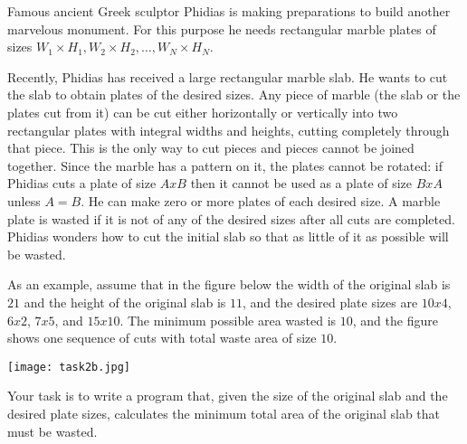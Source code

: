 Famous ancient Greek sculptor Phidias is making preparations to build another marvelous monument.
For this purpose he needs rectangular marble plates of sizes $W_1\times H_1, W_2 \times H_2, \ldots, W_N \times H_N$.

Recently, Phidias has received a large rectangular marble slab.
He wants to cut the slab to obtain plates of the desired sizes.
Any piece of marble (the slab or the plates cut from it) can be cut either horizontally or vertically into two rectangular plates with integral widths and heights, cutting completely through that piece.
This is the only way to cut pieces and pieces cannot be joined together.
Since the marble has a pattern on it, the plates cannot be rotated: if Phidias cuts a plate of size $A x B$ then it cannot be used as a plate of size $B x A$ unless $A = B$.
He can make zero or more plates of each desired size.
A marble plate is wasted if it is not of any of the desired sizes after all cuts are completed.
Phidias wonders how to cut the initial slab so that as little of it as possible will be wasted.

As an example, assume that in the figure below the width of the original slab is $21$ and the height of the original slab is $11$, and the desired plate sizes are $10 x 4$, $6 x 2$, $7 x 5$, and $15 x 10$.
The minimum possible area wasted is $10$, and the figure shows one sequence of cuts with total waste area of size $10$.

\texttt{[image: task2b.jpg]}


Your task is to write a program that, given the size of the original slab and the desired plate sizes, calculates the minimum total area of the original slab that must be wasted.
